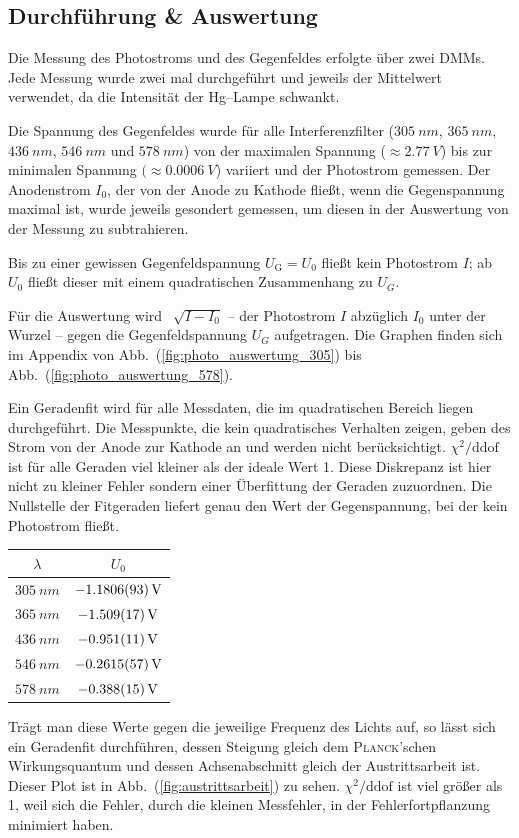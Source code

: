 \documentclass[sn-mathphys-num,iicol]{sn-jnl}
\theoremstyle{thmstyleone}
\theoremstyle{thmstyletwo}
\theoremstyle{thmstylethree}
\begin{document}
\subsection{Durchführung \& Auswertung}
Die Messung des Photostroms und des Gegenfeldes erfolgte über zwei DMMs.
Jede Messung wurde zwei mal durchgeführt und jeweils der Mittelwert verwendet, da die Intensität der Hg--Lampe schwankt.

Die Spannung des Gegenfeldes wurde für alle Interferenzfilter ($\SI{305}{nm}$, $\SI{365}{n m}$, $\SI{436}{n m}$, $\SI{546}{n m}$ und $\SI{578}{n m}$) von der maximalen Spannung ($\approx \SI{2.77}{V}$) bis zur minimalen Spannung $(\approx \SI{0.0006}{V}$) variiert und der Photostrom gemessen.
Der Anodenstrom $I_0$, der von der Anode zu Kathode fließt, wenn die Gegenspannung maximal ist, wurde jeweils gesondert gemessen, um diesen in der Auswertung von der Messung zu subtrahieren.

Bis zu einer gewissen Gegenfeldspannung $U_\text{G}=U_0$ fließt kein Photostrom $I$; ab $U_0$ fließt dieser mit einem quadratischen Zusammenhang zu $U_G$.

Für die Auswertung wird $\,\sqrt[]{I-I_0}$ -- der Photostrom $I$ abzüglich $I_0$ unter der Wurzel -- gegen die Gegenfeldspannung $U_G$ aufgetragen.
Die Graphen finden sich im Appendix von Abb.\ (\ref{fig:photo_auswertung_305}) bis Abb.\ (\ref{fig:photo_auswertung_578}).

Ein Geradenfit wird für alle Messdaten, die im quadratischen Bereich liegen durchgeführt.
Die Messpunkte, die kein quadratisches Verhalten zeigen, geben des Strom von der Anode zur Kathode an und werden nicht berücksichtigt.
$\chi ^2/\text{ddof}$ ist für alle Geraden viel kleiner als der ideale Wert 1.
Diese Diskrepanz ist hier nicht zu kleiner Fehler sondern einer Überfittung der Geraden zuzuordnen.
Die Nullstelle der Fitgeraden liefert genau den Wert der Gegenspannung, bei der kein Photostrom fließt.

\begin{table}[h]
        \begin{tabular}{cc}
                $\lambda $ & $U_0$ \\
                \hline
                $\SI{305}{n m}$ & $\SI{-1.1806+-0.0093}{V}$ \\
                $\SI{365}{n m}$ & $\SI{-1.509+-0.017}{V}$ \\
                $\SI{436}{n m}$ & $\SI{-0.951+-0.011}{V}$ \\
                $\SI{546}{n m}$ & $\SI{-0.2615+-0.0057}{V}$ \\
                $\SI{578}{n m}$ & $\SI{-0.388+-0.015}{V}$ 
        \end{tabular}
\end{table}
Trägt man diese Werte gegen die jeweilige Frequenz des Lichts auf, so lässt sich ein Geradenfit durchführen, dessen Steigung gleich dem \textsc{Planck}'schen Wirkungsquantum und dessen Achsenabschnitt gleich der Austrittsarbeit ist.
Dieser Plot ist in Abb.\ (\ref{fig:austrittsarbeit}) zu sehen.
$\chi ^2/\text{ddof}$ ist viel größer als 1, weil sich die Fehler, durch die kleinen Messfehler, in der Fehlerfortpflanzung minimiert haben.
\end{document}
